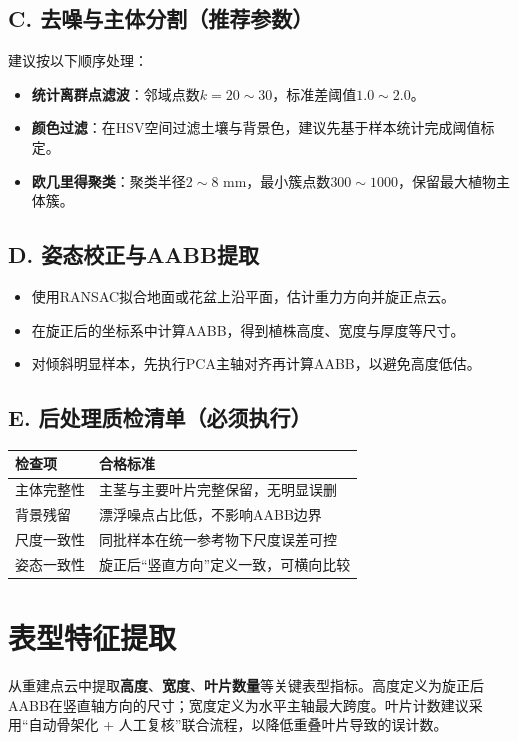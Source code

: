 \documentclass[12pt,a4paper,fontset=fandol]{ctexart}
\begin{document}
\subsection{C. 去噪与主体分割（推荐参数）}
建议按以下顺序处理：
\begin{itemize}
  \item \textbf{统计离群点滤波}：邻域点数$k=20\sim30$，标准差阈值$1.0\sim2.0$。
  \item \textbf{颜色过滤}：在HSV空间过滤土壤与背景色，建议先基于样本统计完成阈值标定。
  \item \textbf{欧几里得聚类}：聚类半径$2\sim8$ mm，最小簇点数$300\sim1000$，保留最大植物主体簇。
\end{itemize}

\subsection{D. 姿态校正与AABB提取}
\begin{itemize}
  \item 使用RANSAC拟合地面或花盆上沿平面，估计重力方向并旋正点云。
  \item 在旋正后的坐标系中计算AABB，得到植株高度、宽度与厚度等尺寸。
  \item 对倾斜明显样本，先执行PCA主轴对齐再计算AABB，以避免高度低估。
\end{itemize}

\subsection{E. 后处理质检清单（必须执行）}
\begin{longtable}{p{}p{}}
\toprule
检查项 & 合格标准 \\
\midrule
主体完整性 & 主茎与主要叶片完整保留，无明显误删 \\
背景残留 & 漂浮噪点占比低，不影响AABB边界 \\
尺度一致性 & 同批样本在统一参考物下尺度误差可控 \\
姿态一致性 & 旋正后“竖直方向”定义一致，可横向比较 \\
\bottomrule
\end{longtable}

\section{表型特征提取}
从重建点云中提取\textbf{高度}、\textbf{宽度}、\textbf{叶片数量}等关键表型指标。高度定义为旋正后AABB在竖直轴方向的尺寸；宽度定义为水平主轴最大跨度。叶片计数建议采用“自动骨架化 + 人工复核”联合流程，以降低重叠叶片导致的误计数。
\end{document}
